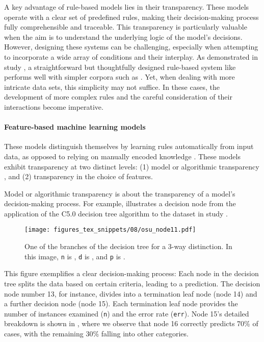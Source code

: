 A key advantage of rule-based models lies in their transparency. These models operate with a clear set of predefined rules, making their decision-making process fully comprehensible and traceable. This transparency is particularly valuable when the aim is to understand the underlying logic of the model's decisions. However, designing these systems can be challenging, especially when attempting to incorporate a wide array of conditions and their interplay. As demonstrated in study \studF, a straightforward but thoughtfully designed rule-based system like  performs well with simpler corpora such as \webnlg. Yet, when dealing with more intricate data sets, this simplicity may not suffice. In these cases, the development of more complex rules and the careful consideration of their interactions become imperative. 

\paragraph*{Feature-based machine learning models} These models distinguish themselves by learning rules automatically from input data, as opposed to relying on manually encoded knowledge \citep{bishop2006pattern}. These models exhibit transparency at two distinct levels: (1) model or algorithmic transparency \citep{BARREDOARRIETA202082}, and (2) transparency in the choice of features.

Model or algorithmic transparency is about the transparency of a model's decision-making process. For example,  illustrates a decision node from the application of the C5.0 decision tree algorithm to the  dataset in study \studB. 

\begin{figure}
	\texttt{[image: figures\_tex\_snippets/08/osu\_node11.pdf]}
	\caption[One of the branches of the  decision tree for a 3-way distinction.]{One of the branches of the  decision tree for a 3-way distinction. In this image, \texttt{n} is , \texttt{d} is , and \texttt{p} is .}
	\label{fig:decisiontreebranch}
\end{figure}

This figure exemplifies a clear decision-making process: Each node in the decision tree splits the data based on certain criteria, leading to a prediction. The decision node number 13, for instance, divides into a termination leaf node (node 14) and a further decision node (node 15). Each termination leaf node provides the number of instances examined (\texttt{n}) and the error rate (\texttt{err}). Node 15’s detailed breakdown is shown in , where we observe that node 16 correctly predicts 70\% of cases, with the remaining 30\% falling into other categories.

